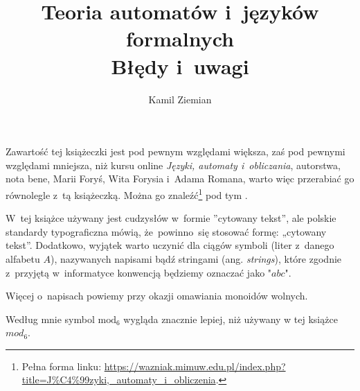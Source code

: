 \documentclass[a4paper,11pt]{article}
\title{Teoria automatów i~języków formalnych \\
  Błędy i~uwagi}
\author{Kamil Ziemian}
\begin{document}





\maketitle %









\start Zawartość tej książeczki jest pod pewnym względami większa, zaś
pod pewnymi względami mniejsza, niż kursu online \textit{Języki,
  automaty i~obliczania}, autorstwa, nota bene, Marii Foryś, Wita
Forysia i~Adama Romana, warto więc przerabiać go równolegle z~tą
książeczką. Można go znaleźć\footnote{Pełna forma linku:
  \href{https://wazniak.mimuw.edu.pl/index.php?title=J\%C4\%99zyki,\_automaty\_i\_obliczenia}
  {https://wazniak.mimuw.edu.pl/index.php?title=J\%C4\%99zyki,\_automaty\_i\_obliczenia}.}
pod tym
.

\vspace{\spaceFour}



\start W~tej książce używany jest cudzysłów w~formie ”cytowany tekst”,
ale polskie standardy typograficzna mówią, że~powinno~się stosować
formę: „cytowany tekst”. Dodatkowo, wyjątek warto uczynić dla ciągów
symboli (liter z~danego alfabetu $A$), nazywanych napisami bądź
stringami (ang. \textit{strings}), które zgodnie z~przyjętą
w~informatyce konwencją będziemy oznaczać jako $\texttt{"} abc \texttt{"}$.

Więcej o~napisach powiemy przy okazji omawiania monoidów wolnych.






\start {} Według mnie symbol $\textrm{mod}_{ 6 }$ wygląda
znacznie lepiej, niż używany w tej książce $mod_{ 6 }$.
\end{document}
